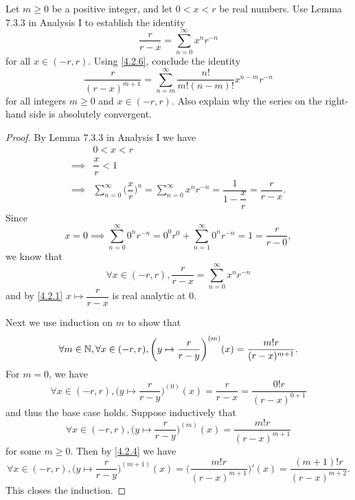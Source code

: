 \begin{ex}\label{ex:4.2.7}
  Let \(m \geq 0\) be a positive integer, and let \(0 < x < r\) be real numbers.
  Use Lemma 7.3.3 in Analysis I to establish the identity
  \[
    \dfrac{r}{r - x} = \sum_{n = 0}^\infty x^n r^{-n}
  \]
  for all \(x \in (-r, r)\).
  Using \cref{4.2.6}, conclude the identity
  \[
    \dfrac{r}{(r - x)^{m + 1}} = \sum_{n = m}^\infty \dfrac{n!}{m! (n - m)!} x^{n - m} r^{-n}
  \]
  for all integers \(m \geq 0\) and \(x \in (-r, r)\).
  Also explain why the series on the right-hand side is absolutely convergent.
\end{ex}

\begin{proof}
  By Lemma 7.3.3 in Analysis I we have
  \begin{align*}
             & 0 < x < r                                                                                                                         \\
    \implies & \dfrac{x}{r} < 1                                                                                                                  \\
    \implies & \sum_{n = 0}^\infty \bigg(\dfrac{x}{r}\bigg)^n = \sum_{n = 0}^\infty x^n r^{-n} = \dfrac{1}{1 - \dfrac{x}{r}} = \dfrac{r}{r - x}.
  \end{align*}
  Since
  \[
    x = 0 \implies \sum_{n = 0}^\infty 0^n r^{-n} = 0^0 r^{0} + \sum_{n = 1}^\infty 0^n r^{-n} = 1 = \dfrac{r}{r - 0},
  \]
  we know that
  \[
    \forall x \in (-r, r), \dfrac{r}{r - x} = \sum_{n = 0}^\infty x^n r^{-n}
  \]
  and by \cref{4.2.1} \(x \mapsto \dfrac{r}{r - x}\) is real analytic at \(0\).

  Next we use induction on \(m\) to show that
  \[
    \forall m \in \mathbb{N}, \forall x \in (-r, r), \bigg(y \mapsto \dfrac{r}{r - y}\bigg)^{(m)}(x) = \dfrac{m! r}{(r - x)^{m + 1}}.
  \]
  For \(m = 0\), we have
  \[
    \forall x \in (-r, r), \bigg(y \mapsto \dfrac{r}{r - y}\bigg)^{(0)}(x) = \dfrac{r}{r - x} = \dfrac{0! r}{(r - x)^{0 + 1}}
  \]
  and thus the base case holds.
  Suppose inductively that
  \[
    \forall x \in (-r, r), \bigg(y \mapsto \dfrac{r}{r - y}\bigg)^{(m)}(x) = \dfrac{m! r}{(r - x)^{m + 1}}
  \]
  for some \(m \geq 0\).
  Then by \cref{4.2.4} we have
  \[
    \forall x \in (-r, r), \bigg(y \mapsto \dfrac{r}{r - y}\bigg)^{(m + 1)}(x) = \bigg(\dfrac{m! r}{(r - x)^{m + 1}}\bigg)'(x) = \dfrac{(m + 1)! r}{(r - x)^{m + 2}}.
  \]
  This closes the induction.


\end{proof}

